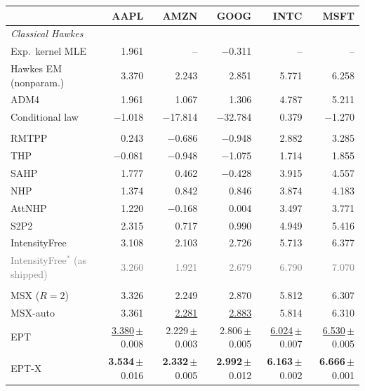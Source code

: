 \begin{tabular}{lrrrrr}
\toprule
& AAPL & AMZN & GOOG & INTC & MSFT \\
\midrule
\multicolumn{6}{l}{\textit{Classical Hawkes}} \\[1pt]
\quad Exp.\ kernel MLE & 1.961 & -- & $-$0.311 & -- & -- \\
\quad Hawkes EM (nonparam.) & 3.370 & 2.243 & 2.851 & 5.771 & 6.258 \\
\quad ADM4 & 1.961 & 1.067 & 1.306 & 4.787 & 5.211 \\
\quad Conditional law & $-$1.018 & $-$17.814 & $-$32.784 & 0.379 & $-$1.270 \\
\addlinespace[3pt]\multicolumn{6}{l}{\textit{Neural TPPs (EasyTPP, our runs)}} \\[1pt]
\quad RMTPP & 0.243 & $-$0.686 & $-$0.948 & 2.882 & 3.285 \\
\quad THP & $-$0.081 & $-$0.948 & $-$1.075 & 1.714 & 1.855 \\
\quad SAHP & 1.777 & 0.462 & $-$0.428 & 3.915 & 4.557 \\
\quad NHP & 1.374 & 0.842 & 0.846 & 3.874 & 4.183 \\
\quad AttNHP & 1.220 & $-$0.168 & 0.004 & 3.497 & 3.771 \\
\quad S2P2 & 2.315 & 0.717 & 0.990 & 4.949 & 5.416 \\
\quad IntensityFree & 3.108 & 2.103 & 2.726 & 5.713 & 6.377 \\
\quad \textcolor{gray}{IntensityFree$^\ast$ (as shipped)} & \textcolor{gray}{3.260} & \textcolor{gray}{1.921} & \textcolor{gray}{2.679} & \textcolor{gray}{6.790} & \textcolor{gray}{7.070} \\
\addlinespace[3pt]\multicolumn{6}{l}{\textit{Ours}} \\[1pt]
\rowcolor{oursbg} \quad MSX ($R=2$) & 3.326 & 2.249 & 2.870 & 5.812 & 6.307 \\
\rowcolor{oursbg} \quad MSX-auto & 3.361 & \underline{2.281} & \underline{2.883} & 5.814 & 6.310 \\
\rowcolor{oursbg} \quad EPT & \underline{3.380}{\scriptsize\,$\pm$0.008} & 2.229{\scriptsize\,$\pm$0.003} & 2.806{\scriptsize\,$\pm$0.005} & \underline{6.024}{\scriptsize\,$\pm$0.007} & \underline{6.530}{\scriptsize\,$\pm$0.005} \\
\rowcolor{oursbg} \quad EPT-X & \textbf{3.534}{\scriptsize\,$\pm$0.016} & \textbf{2.332}{\scriptsize\,$\pm$0.005} & \textbf{2.992}{\scriptsize\,$\pm$0.012} & \textbf{6.163}{\scriptsize\,$\pm$0.002} & \textbf{6.666}{\scriptsize\,$\pm$0.001} \\
\bottomrule
\end{tabular}